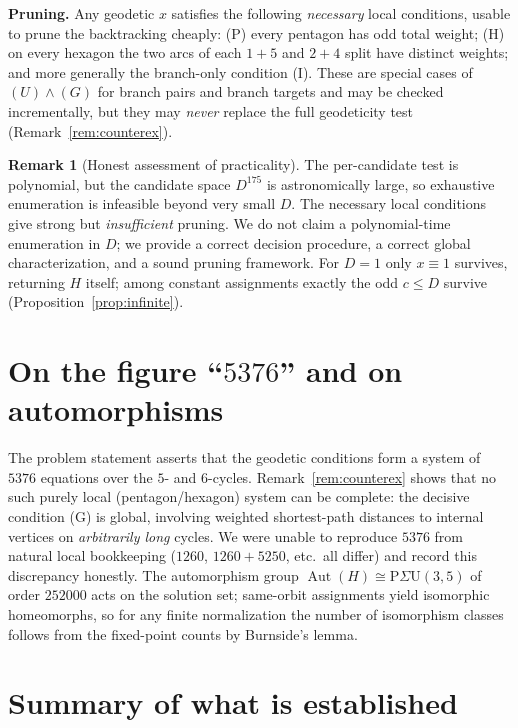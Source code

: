 \documentclass{amsart}
\theoremstyle{definition}
\newtheorem{remark}{Remark}
\begin{document}
\noindent\textbf{Pruning.} Any geodetic $x$ satisfies the following \emph{necessary}
local conditions, usable to prune the backtracking cheaply:
(P) every pentagon has odd total weight; (H) on every hexagon the two arcs of
each $1{+}5$ and $2{+}4$ split have distinct weights; and more generally the
branch-only condition (I). These are special cases of $(U)\wedge(G)$ for branch
pairs and branch targets and may be checked incrementally, but they may
\emph{never} replace the full geodeticity test (Remark~\ref{rem:counterex}).

\begin{remark}[Honest assessment of practicality]
The per-candidate test is polynomial, but the candidate space $D^{175}$ is
astronomically large, so exhaustive enumeration is infeasible beyond very small
$D$. The necessary local conditions give strong but \emph{insufficient} pruning.
We do not claim a polynomial-time enumeration in $D$; we provide a correct
decision procedure, a correct global characterization, and a sound pruning
framework. For $D=1$ only $x\equiv1$ survives, returning $H$ itself; among
constant assignments exactly the odd $c\le D$ survive
(Proposition~\ref{prop:infinite}).
\end{remark}

\section{On the figure ``$5376$'' and on automorphisms}

The problem statement asserts that the geodetic conditions form a system of
$5376$ equations over the $5$- and $6$-cycles. Remark~\ref{rem:counterex} shows
that no such purely local (pentagon/hexagon) system can be complete: the decisive
condition (G) is global, involving weighted shortest-path distances to internal
vertices on \emph{arbitrarily long} cycles. We were unable to reproduce $5376$
from natural local bookkeeping ($1260$, $1260+5250$, etc.\ all differ) and record
this discrepancy honestly. The automorphism group
$\operatorname{Aut}(H)\cong\mathrm P\Sigma\mathrm U(3,5)$ of order $252000$ acts
on the solution set; same-orbit assignments yield isomorphic homeomorphs, so for
any finite normalization the number of isomorphism classes follows from the
fixed-point counts by Burnside's lemma.

\section{Summary of what is established}
\end{document}
